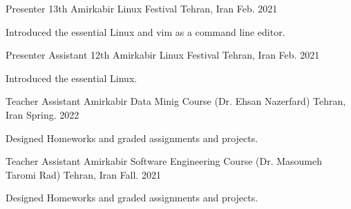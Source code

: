 

\begin{cventries}

    \cventry
    {Presenter} %
    {13th Amirkabir Linux Festival} %
    {Tehran, Iran} %
    {Feb. 2021} %
    {
        \begin{cvitems} %
            \item {Introduced the essential Linux and vim as a command line editor.}
        \end{cvitems}
    }

    \cventry
    {Presenter Assistant} %
    {12th Amirkabir Linux Festival} %
    {Tehran, Iran} %
    {Feb. 2021} %
    {
        \begin{cvitems} %
            \item {Introduced the essential Linux.}
        \end{cvitems}
    }

    \cventry
    {Teacher Assistant} %
    {Amirkabir Data Minig Course (Dr. Ehsan Nazerfard)} %
    {Tehran, Iran} %
    {Spring. 2022} %
    {
        \begin{cvitems} %
            \item {Designed Homeworks and graded assignments and projects.}
        \end{cvitems}
    }

    \cventry
    {Teacher Assistant} %
    {Amirkabir Software Engineering Course (Dr. Masoumeh Taromi Rad)} %
    {Tehran, Iran} %
    {Fall. 2021} %
    {
        \begin{cvitems} %
            \item {Designed Homeworks and graded assignments and projects.}
        \end{cvitems}
    }


\end{cventries}
